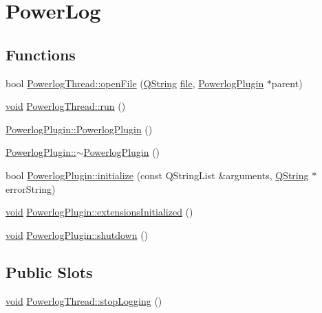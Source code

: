 \hypertarget{group___power_log}{\section{\-Power\-Log}
\label{group___power_log}
}
\subsection*{\-Functions}
\begin{DoxyCompactItemize}
\item 
bool \hyperlink{group___power_log_gac2181c168547833f7826354c333cd431}{\-Powerlog\-Thread\-::open\-File} (\hyperlink{group___u_a_v_objects_plugin_gab9d252f49c333c94a72f97ce3105a32d}{\-Q\-String} \hyperlink{uavobjecttemplate_8m_a97c04efa65bcf0928abf9260bc5cbf46}{file}, \hyperlink{class_powerlog_plugin}{\-Powerlog\-Plugin} $\ast$parent)
\item 
\hyperlink{group___u_a_v_objects_plugin_ga444cf2ff3f0ecbe028adce838d373f5c}{void} \hyperlink{group___power_log_ga8a04077cf7c30019689b894c73cb0020}{\-Powerlog\-Thread\-::run} ()
\item 
\hyperlink{group___power_log_ga9e38cb901b8c4d1f73f06f2b6e481e2e}{\-Powerlog\-Plugin\-::\-Powerlog\-Plugin} ()
\item 
\hyperlink{group___power_log_ga2556b7dd74c9d3c635c84f31a40269cd}{\-Powerlog\-Plugin\-::$\sim$\-Powerlog\-Plugin} ()
\item 
bool \hyperlink{group___power_log_gadc5a5af4c3942d0ec384cad6f677cef3}{\-Powerlog\-Plugin\-::initialize} (const \-Q\-String\-List \&arguments, \hyperlink{group___u_a_v_objects_plugin_gab9d252f49c333c94a72f97ce3105a32d}{\-Q\-String} $\ast$error\-String)
\item 
\hyperlink{group___u_a_v_objects_plugin_ga444cf2ff3f0ecbe028adce838d373f5c}{void} \hyperlink{group___power_log_gabdc836ec2b2a95cfe56fabe4d8c8e629}{\-Powerlog\-Plugin\-::extensions\-Initialized} ()
\item 
\hyperlink{group___u_a_v_objects_plugin_ga444cf2ff3f0ecbe028adce838d373f5c}{void} \hyperlink{group___power_log_gabcda6ddff409dc11244b3df09276d0cc}{\-Powerlog\-Plugin\-::shutdown} ()
\end{DoxyCompactItemize}
\subsection*{\-Public \-Slots}
\begin{DoxyCompactItemize}
\item 
\hyperlink{group___u_a_v_objects_plugin_ga444cf2ff3f0ecbe028adce838d373f5c}{void} \hyperlink{group___power_log_ga9a391d6c905ecddc9bbc2dd34f055d7c}{\-Powerlog\-Thread\-::stop\-Logging} ()
\end{DoxyCompactItemize}



